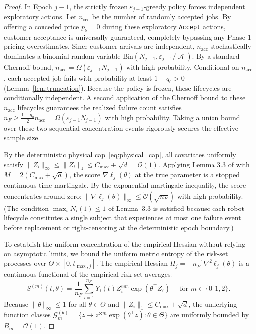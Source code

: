 \documentclass[letterpaper, 10 pt, conference]{IEEEconf}
\begin{document}
\begin{proof}
    In Epoch $j-1$, the strictly frozen $\varepsilon_{j-1}$-greedy policy forces independent exploratory actions. Let $n_{\mathrm{acc}}$ be the number of randomly accepted jobs. By offering a conceded price $p_k = 0$ during these exploratory \texttt{Accept} actions, customer acceptance is universally guaranteed, completely bypassing any Phase 1 pricing overestimates. Since customer arrivals are independent, $n_{\mathrm{acc}}$ stochastically dominates a binomial random variable $\mathrm{Bin}(N_{j-1}, \varepsilon_{j-1}/|\mathcal{A}|)$. By a standard Chernoff bound, $n_{\mathrm{acc}} = \Omega(\varepsilon_{j-1} N_{j-1})$ with high probability. Conditional on $n_{\mathrm{acc}}$, each accepted job fails with probability at least $1 - q_0 > 0$ (Lemma~\ref{lem:truncation}). Because the policy is frozen, these lifecycles are conditionally independent. A second application of the Chernoff bound to these $n_{\mathrm{acc}}$ lifecycles guarantees the realized failure count satisfies $n_F \ge \frac{1-q_0}{2} n_{\mathrm{acc}} = \Omega(\varepsilon_{j-1} N_{j-1})$ with high probability. Taking a union bound over these two sequential concentration events rigorously secures the effective sample size.

    By the deterministic physical cap~\eqref{eq:physical_cap}, all covariates uniformly satisfy $\|Z_i\|_\infty \leq \|Z_i\|_1 \le C_{\max} + \sqrt{d} = \mathcal{O}(1)$. Applying Lemma 3.3 of \cite{huang2013} with $M = 2(C_{\max} + \sqrt{d})$, the score $\nabla \ell_j(\theta)$ at the true parameter is a stopped continuous-time martingale. By the exponential martingale inequality, the score concentrates around zero: $\|\nabla \ell_j(\theta)\|_\infty \leq \widetilde{\mathcal{O}}(\sqrt{n_F})$ with high probability. (The condition $\max_i N_i(1) \leq 1$ of Lemma~3.3 is satisfied because each robot lifecycle constitutes a single subject that experiences at most one failure event before replacement or right-censoring at the deterministic epoch boundary.)

    To establish the uniform concentration of the empirical Hessian without relying on asymptotic limits, we bound the uniform metric entropy of the risk-set processes over $\Theta \times [0, t_{\max,j}]$. The empirical Hessian $H_j = -n_F^{-1} \nabla^2 \ell_j(\theta)$ is a continuous functional of the empirical risk-set averages:
    \begin{equation}
        S^{(m)}(t, \theta) = \frac{1}{n_F} \sum_{i=1}^{n_F} Y_i(t) Z_i^{\otimes m} \exp(\theta^\top Z_i), \quad \text{for } m \in \{0, 1, 2\}.
    \end{equation}
    Because $\|\theta\|_\infty \le 1$ for all $\theta \in \Theta$ and $\|Z_i\|_1 \le C_{\max} + \sqrt{d}$, the underlying function classes $\mathcal{G}_m^{(\theta)} = \{ z \mapsto z^{\otimes m} \exp(\theta^\top z) : \theta \in \Theta \}$ are uniformly bounded by $B_m = \mathcal{O}(1)$.


\end{proof}
\end{document}

